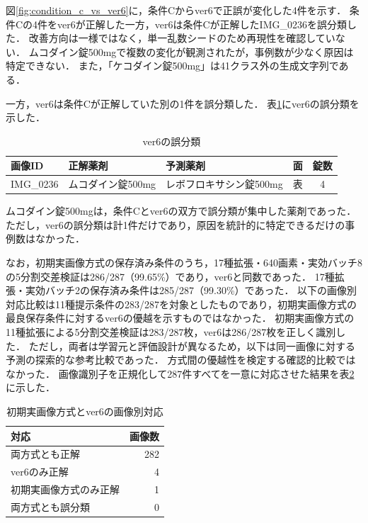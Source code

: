 \documentclass[uplatex,dvipdfmx]{jsarticle}
\begin{document}
図\ref{fig:condition_c_vs_ver6}に，条件Cからver6で正誤が変化した4件を示す．
条件Cの4件をver6が正解した一方，ver6は条件Cが正解したIMG\_0236を誤分類した．
改善方向は一様ではなく，単一乱数シードのため再現性を確認していない．
ムコダイン錠500mgで複数の変化が観測されたが，事例数が少なく原因は特定できない．
また，「ケコダイン錠500mg」は41クラス外の生成文字列である．

一方，ver6は条件Cが正解していた別の1件を誤分類した．
表\ref{tab:single_errors}にver6の誤分類を示した．

\begin{table}[H]
  \centering
  \caption{ver6の誤分類}
  \label{tab:single_errors}
  \small
  \begin{tabular}{|p{3.8cm}|p{3.5cm}|p{3.8cm}|c|c|}
    \hline
    画像ID & 正解薬剤 & 予測薬剤 & 面 & 錠数 \\ \hline
    IMG\_0236 & ムコダイン錠500mg & レボフロキサシン錠500mg & 表 & 4 \\ \hline
  \end{tabular}
\end{table}

ムコダイン錠500mgは，条件Cとver6の双方で誤分類が集中した薬剤であった．
ただし，ver6の誤分類は計1件だけであり，原因を統計的に特定できるだけの事例数はなかった．

なお，初期実画像方式の保存済み条件のうち，17種拡張・640画素・実効バッチ8の5分割交差検証は286/287（99.65\%）であり，ver6と同数であった．
17種拡張・実効バッチ2の保存済み条件は285/287（99.30\%）であった．
以下の画像別対応比較は11種提示条件の283/287を対象としたものであり，初期実画像方式の最良保存条件に対するver6の優越を示すものではなかった．
初期実画像方式の11種拡張による5分割交差検証は283/287枚，ver6は286/287枚を正しく識別した．
ただし，両者は学習元と評価設計が異なるため，以下は同一画像に対する予測の探索的な参考比較であった．
方式間の優越性を検定する確認的比較ではなかった．
画像識別子を正規化して287件すべてを一意に対応させた結果を表\ref{tab:paired_initial_web}に示した．

\begin{table}[H]
  \centering
  \caption{初期実画像方式とver6の画像別対応}
  \label{tab:paired_initial_web}
  \small
  \begin{tabular}{|l|r|}
    \hline
    対応 & 画像数 \\ \hline
    両方式とも正解 & 282 \\ \hline
    ver6のみ正解 & 4 \\ \hline
    初期実画像方式のみ正解 & 1 \\ \hline
    両方式とも誤分類 & 0 \\ \hline
  \end{tabular}
\end{table}
\end{document}
